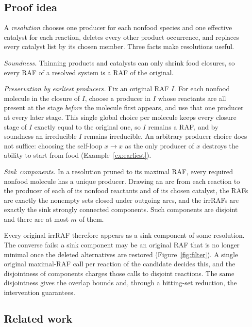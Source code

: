 \documentclass[11pt,a4paper]{article}
\theoremstyle{plain}
\theoremstyle{definition}
\theoremstyle{remark}
\begin{document}
\subsection{Proof idea}

A \emph{resolution} chooses one producer for each nonfood species and one effective catalyst for each reaction, deletes every other product occurrence, and replaces every catalyst list by its chosen member. Three facts make resolutions useful.

\emph{Soundness.} Thinning products and catalysts can only shrink food closures, so every RAF of a resolved system is a RAF of the original.

\emph{Preservation by earliest producers.} Fix an original RAF $I$. For each nonfood molecule in the closure of $I$, choose a producer in $I$ whose reactants are all present at the stage \emph{before} the molecule first appears, and use that one producer at every later stage. This single global choice per molecule keeps every closure stage of $I$ exactly equal to the original one, so $I$ remains a RAF, and by soundness an irreducible $I$ remains irreducible. An arbitrary producer choice does not suffice: choosing the self-loop $x\to x$ as the only producer of $x$ destroys the ability to start from food (Example~\ref{ex:earliest}).

\emph{Sink components.} In a resolution pruned to its maximal RAF, every required nonfood molecule has a unique producer. Drawing an arc from each reaction to the producer of each of its nonfood reactants and of its chosen catalyst, the RAFs are exactly the nonempty sets closed under outgoing arcs, and the irrRAFs are exactly the sink strongly connected components. Such components are disjoint and there are at most $m$ of them.

Every original irrRAF therefore appears as a sink component of some resolution. The converse fails: a sink component may be an original RAF that is no longer minimal once the deleted alternatives are restored (Figure~\ref{fig:filter}). A single original maximal-RAF call per reaction of the candidate decides this, and the disjointness of components charges those calls to disjoint reactions. The same disjointness gives the overlap bounds and, through a hitting-set reduction, the intervention guarantees.

\subsection{Related work}
\end{document}
